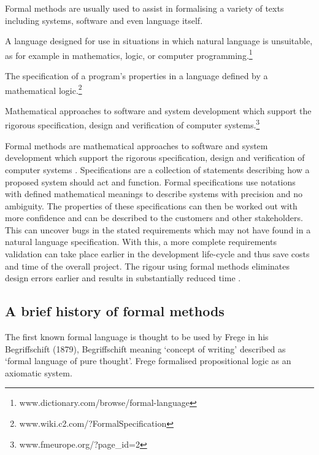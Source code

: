 Formal methods are usually used to assist in formalising a variety of texts
including systems, software and even language itself.

\begin{defin} A language designed for use in situations in
which natural language is unsuitable, as for example in mathematics, logic, or
computer programming.\footnote{www.dictionary.com/browse/formal-language}
\end{defin}

\begin{defin} The specification of a program's properties
in a language defined by a mathematical
logic.\footnote{www.wiki.c2.com/?FormalSpecification}
\end{defin}

\begin{defin} Mathematical approaches to software and system
development which support the rigorous specification, design and verification of
computer systems.\footnote{www.fmeurope.org/?page\_id=2}
\end{defin}

Formal methods are mathematical approaches to software and system development
which support the rigorous specification, design and verification of computer
systems \cite{fmeurope}. Specifications are a collection of statements
describing how a proposed system should act and function. Formal specifications
use notations with defined mathematical meanings to describe systems with
precision and no ambiguity. The properties of these specifications can then be
worked out with more confidence and can be described to the customers and other
stakeholders. This can uncover bugs in the stated requirements which may not
have found in a natural language specification. With this, a more complete
requirements validation can take place earlier in the development life-cycle and
thus save costs and time of the overall project. The rigour using formal methods
eliminates design errors earlier and results in substantially reduced time
\cite{benefitsofform}. 

\subsection{A brief history of formal methods}

The first known formal language is thought to be used by Frege in his
Begriffschift (1879), Begriffschift meaning `concept of writing' described as
`formal language of pure thought'. Frege formalised propositional logic as an
axiomatic system.

